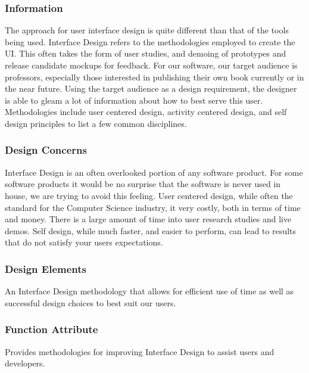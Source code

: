\documentclass[onecolumn, draftclsnofoot,10pt, compsoc]{IEEEtran}
\begin{document}
\subsubsection{Information}
\noindent The approach for user interface design is quite different
than that of the tools being used. Interface Design refers to the
methodologies employed to create the UI. This often takes the form of
user studies, and demoing of prototypes and release candidate mockups
for feedback. For our software, our target audience is professors,
especially those interested in publishing their own book currently or
in the near future. Using the target audience as a design requirement,
the designer is able to gleam a lot of information about how to best
serve this user. Methodologies include user centered design, activity 
centered design, and self design principles to list a few common 
disciplines. \\

\subsubsection{Design Concerns}
\noindent Interface Design is an often overlooked portion of any software 
product. For some software products it would be no surprise that the software 
is never used in house, we are trying to avoid this feeling.
User centered design, while often the standard for the Computer Science 
industry, it very costly, both in terms of time and money. There is a large 
amount of time into user research studies and live demos. Self design, while 
much faster, and easier to perform, can lead to results that do not satisfy 
your users expectations.\\

\subsubsection{Design Elements}
\noindent An Interface Design methodology that allows for efficient
use of time as well as successful design choices to best suit our users. \\

\subsubsection{Function Attribute}
\noindent Provides methodologies for improving Interface Design to assist
users and developers. \\

\newpage
\end{document}
